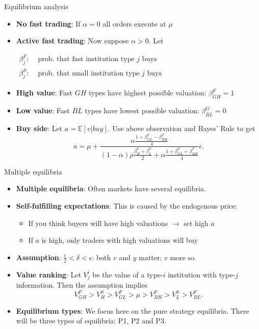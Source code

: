 \documentclass[english,10pt
,aspectratio=169
]{beamer}
\begin{document}
\begin{frame}{Equilibrium analysis}
	\begin{itemize}
		\item \textbf{No fast trading}: If $\alpha=0$ all orders execute at $\mu$
		\item \textbf{Active fast trading}: Now suppose $\alpha>0$. Let
		\smallskip
		\begin{center}
			$
			\displaystyle
			\begin{aligned}
			\beta^{F}_{j}: & \text{ prob. that fast institution type $j$ buys} \\ 
			\beta^{S}_{j}: & \text{ prob. that small institution type $j$ buys} 
			\end{aligned}
			$
		\end{center}
		\item \textbf{High value}: Fast $GH$ types have highest possible valuation: $\beta^{F}_{GH}=1$
		\item \textbf{Low value}: Fast $BL$ types have lowest possible valuation: $\beta^{G}_{BL}=0$
		\item \textbf{Buy side}: Let $a  =\mathbb{E}[v|buy]$. Use above observation and Bayes' Rule to get
		\[a =\mu+\frac{\alpha\frac{1+\beta^{F}_{GL}-\beta^{F}_{BH}}{4}}{(1-\alpha)\rho\frac{\beta^{S}_{H}+\beta^{S}_{L}}{2}+\alpha\frac{1+\beta^{F}_{GL}+\beta^{F}_{BH}}{4}} \epsilon.
		\]
	\end{itemize}
\end{frame}


\begin{frame}{Multiple equilibria}
	\begin{itemize}
		\item \textbf{Multiple equilibria}: Often markets have several equilibria.
		\item \textbf{Self-fulfilling expectations}: This is caused by the endogenous price:
		\begin{itemize}
			\item If you think buyers will have high valuations $\rightarrow$ set high $a$
			\item If $a$ is high, only traders with high valuations will buy
		\end{itemize}
		\item \textbf{Assumption}:  $\frac{\epsilon}{2} < \delta < \epsilon$: both $v$ and $y$ matter; $v$ more so.
		\item \textbf{Value ranking}: Let $V^i_j$ be the value of a type-$i$ institution with type-$j$ information. Then the assumption implies
		\[
		V^F_{GH}>V^S_H>V^F_{GL}>\mu>V^F_{BH}>V^S_L>V^F_{BL}.
		\]
		\item \textbf{Equilibrium types}: We focus here on the pure strategy equilibria. There will be three types of equilibria: P1, P2 and P3.
	\end{itemize}
\end{frame}
\end{document}
